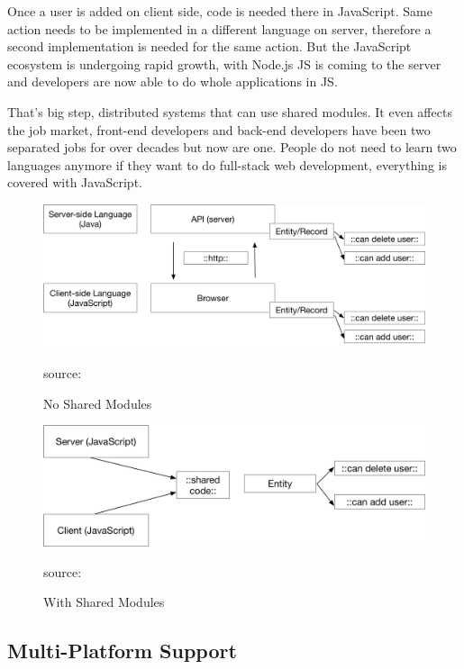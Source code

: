 Once a user is added on client side, code is needed there in JavaScript. Same action needs to be implemented in a different language on server, 
therefore a second implementation is needed for the same action.
But the JavaScript ecosystem is undergoing rapid growth, with Node.js \gls{JS} is coming to the server and developers are now able to do whole applications in \gls{JS}.

That's big step, distributed systems that can use shared modules. It even affects the job market, front-end developers and back-end developers have been two separated jobs for over decades but now are one. People do not need to learn two languages anymore if they want to do full-stack web development, everything is covered with JavaScript.

\begin{figure}[H]
	\centering
	\includegraphics[width=\linewidth]{bilder/grundlagen/Entity1.png}
	\caption{No Shared Modules} source:\cite{Distributed1}
	\label{fig:DS1}
\end{figure}

\begin{figure}[H]
	\centering
	\includegraphics[width=\linewidth]{bilder/grundlagen/Entity2.png}
	\caption{With Shared Modules} source:\cite{Distributed2}
	\label{fig:DS2}
\end{figure}


\subsection{Multi-Platform Support}

